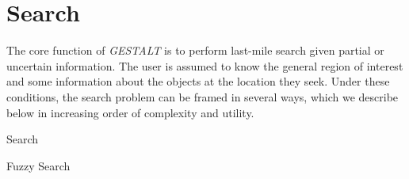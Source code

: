 \section{Search}
\label{section:search}

The core function of \textit{GESTALT} is to perform last-mile search given partial or uncertain information.
The user is assumed to know the general region of interest and some information about the objects at the location they seek.
Under these conditions, the search problem can be framed in several ways, which we describe below in increasing order of complexity and utility.

\begin{algorithm}
    \caption{Search}\label{alg:search}
    \begin{algorithmic}
        \State{- - - - -}
            \EndFor
            \EndProcedure
    \end{algorithmic}
\end{algorithm}

\begin{algorithm}
    \caption{Fuzzy Search}\label{alg:fuzzySearch}
    \begin{algorithmic}[2]
        \State{- - - - -}
                \Else
                \EndIf
            \EndIf
            \EndIf
        \EndProcedure
    \end{algorithmic}
\end{algorithm}


